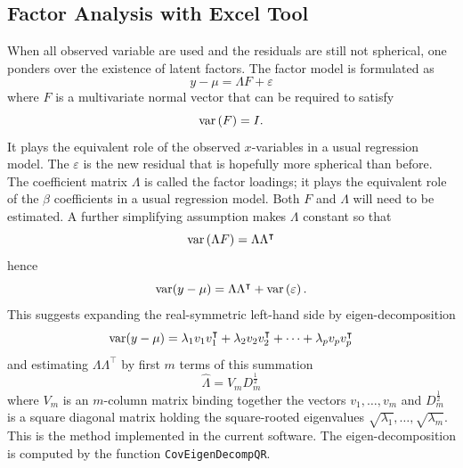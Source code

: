 \documentclass[article]{jss}
\numberwithin{equation}{subsection}
\begin{document}
        \subsection[egFactor]{Factor Analysis with Excel Tool}
        When all observed variable are used and the residuals are still not spherical, one ponders over the existence of latent factors. The factor model is formulated as
        $$y  - \mu = \Lambda F + \varepsilon$$
        where $F$ is a multivariate normal vector that can be required to satisfy 
        $${\mathop{\rm var}} \left( F \right) = I.$$
        It plays the equivalent role of the observed $x$-variables in a usual regression model. The $\varepsilon$ is the new residual that is hopefully more spherical than before. The coefficient matrix $\Lambda$ is called the factor loadings; it plays the equivalent role of the $\beta$ coefficients in a usual regression model. Both $F$ and $\Lambda$ will need to be estimated. A further simplifying assumption makes $\Lambda$ constant so that
        \begin{equation}\label{eq:common covariance}
	        {\mathop{\rm var}} \left( {\Lambda F} \right) = \Lambda {\Lambda ^\intercal}
        \end{equation}
        hence
        \begin{equation}
	        {\mathop{\rm var}} (y - \mu ) = \Lambda {\Lambda ^\intercal} + {\mathop{\rm var}} \left( \varepsilon  \right).
        \end{equation}
        This suggests expanding the real-symmetric left-hand side by eigen-decomposition
        \begin{equation}
	        {\mathop{\rm var}} (y - \mu ) = {\lambda _1}{v_1}v_1^\intercal + {\lambda _2}{v_2}v_2^\intercal +  \cdots  + {\lambda _p}{v_p}v_p^\intercal
        \end{equation}
        and estimating $\Lambda {\Lambda ^\intercal}$ by first $m$ terms of this summation 
        \begin{equation}\label{eq:loading matrix}
        \hat\Lambda = V_m D_m^{\frac{1}{2}}
        \end{equation}
        where $V_m$ is an $m$-column matrix binding together the vectors $v_1, \ldots, v_m$ and $D_m^\frac{1}{2}$ is a square diagonal matrix holding the square-rooted eigenvalues $\sqrt{\lambda_1}, \ldots, \sqrt{\lambda_m}$.
        This is the method implemented in the current software. The eigen-decomposition is computed by the  function \texttt{CovEigenDecompQR}.
        
\end{document}
